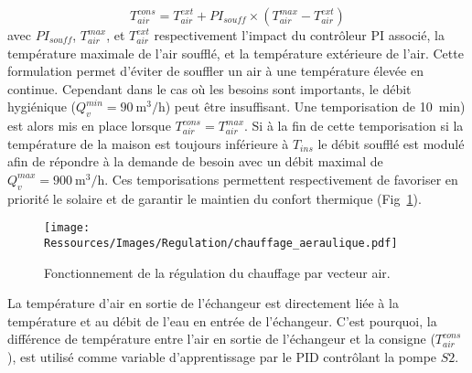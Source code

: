 \begin{equation}\label{eq:temp_soufflage}
    T_{air}^{cons} = T_{air}^{ext} + PI_{souff} \times (T_{air}^{max} - T_{air}^{ext})
\end{equation}
avec $PI_{souff}$, $T_{air}^{max}$, et $T_{air}^{ext}$ respectivement l’impact du
contrôleur PI associé, la température maximale de l’air soufflé, et la température
extérieure de l’air. Cette formulation permet d’éviter de souffler un air à une
température élevée en continue. Cependant dans le cas où les besoins sont importants, le
débit hygiénique ($Q_{v}^{min} = \SI[per-mode=symbol]{90}{\meter\cubed\per\hour}$) peut être insuffisant. Une
temporisation de \SI{10}{min}) est alors mis en place lorsque $T_{air}^{cons} =
T_{air}^{max}$. Si à la fin de cette temporisation si la température de la maison est
toujours inférieure à $T_{ins}$ le débit soufflé est modulé afin de répondre à la demande
de besoin avec un débit maximal de $Q_{v}^{max} = \SI[per-mode=symbol]{900}{\meter\cubed\per\hour}$. Ces
temporisations permettent respectivement de favoriser en priorité le solaire et de
garantir le maintien du confort thermique (Fig~\ref{fig:chauffage_aeraulique}).

\begin{figure}
    \begin{center}
        \texttt{[image: Ressources/Images/Regulation/chauffage\_aeraulique.pdf]}
    \end{center}
    \caption{Fonctionnement de la régulation du chauffage par vecteur air.
             \label{fig:chauffage_aeraulique}}
\end{figure}

La température d’air en sortie de l’échangeur est directement liée à la température et au
débit de l’eau en entrée de l’échangeur. C’est pourquoi, la différence de température
entre l’air en sortie de l’échangeur et la consigne ($T_{air}^{cons}$), est utilisé comme
variable d’apprentissage par le PID contrôlant la pompe $S2$.



